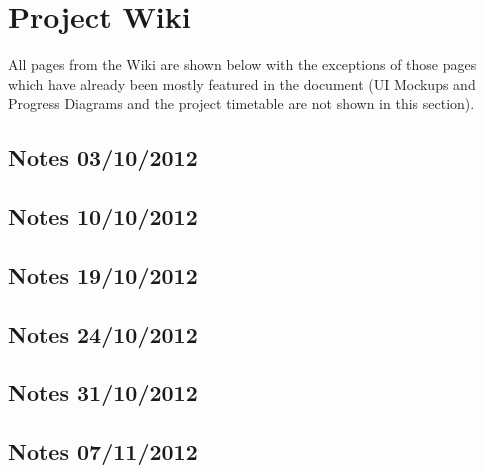 \pagebreak
\section{Project Wiki}
\label{sec:wiki}

All pages from the Wiki are shown below with the exceptions of those pages
which have already been mostly featured in the document (UI Mockups and
Progress Diagrams and the project timetable are not shown in this section).

\subsection{ Notes 03/10/2012 }


\subsection{ Notes 10/10/2012 }


\subsection{ Notes 19/10/2012 }


\subsection{ Notes 24/10/2012 }


\subsection{ Notes 31/10/2012 }


\subsection{ Notes 07/11/2012 }




\pagebreak


